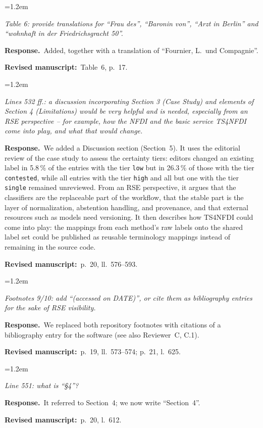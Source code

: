 \documentclass[11pt,a4paper]{article}
\newenvironment{reviewercomment}
  {\par\smallskip\begin{list}{}{\leftmargin=1.2em\rightmargin=0pt}\item[]\color{black!75}\itshape}
  {\end{list}\smallskip}
\newcommand{\response}{\par\noindent\textbf{Response.}~}
\newcommand{\where}[1]{\par\noindent\textbf{Revised manuscript:}~#1\par\medskip}
\begin{document}
\begin{enumerate}[label=\textbf{I\arabic*}, leftmargin=2.2em, itemsep=0.8em]
\item
\begin{reviewercomment}
Table 6: provide translations for ``Frau des'', ``Baronin von'', ``Arzt in Berlin'' and ``wohnhaft in
der Friedrichsgracht 50''.
\end{reviewercomment}
\response Added, together with a translation of ``Fournier, L.\ und Compagnie''.
\where{Table~6, p.~17.}

\item
\begin{reviewercomment}
Lines 532 ff.: a discussion incorporating Section 3 (Case Study) and elements of Section 4
(Limitations) would be very helpful and is needed, especially from an RSE perspective -- for example,
how the NFDI and the basic service TS4NFDI come into play, and what that would change.
\end{reviewercomment}
\response We added a Discussion section (Section~5). It uses the editorial review of the case study to
assess the certainty tiers: editors changed an existing label in 5.8\,\% of the entries with the tier
\texttt{low} but in 26.3\,\% of those with the tier \texttt{contested}, while all entries with the tier
\texttt{high} and all but one with the tier \texttt{single} remained unreviewed. From an RSE perspective, it argues that the
classifiers are the replaceable part of the workflow, that the stable part is the layer of
normalization, abstention handling, and provenance, and that external resources such as models need
versioning. It then describes how TS4NFDI could come into play: the mappings from each method's raw
labels onto the shared label set could be published as reusable terminology mappings instead of
remaining in the source code.
\where{p.~20, ll.~576--593.}

\item
\begin{reviewercomment}
Footnotes 9/10: add ``(accessed on DATE)'', or cite them as bibliography entries for the sake of RSE
visibility.
\end{reviewercomment}
\response We replaced both repository footnotes with citations of a bibliography entry for the
software (see also Reviewer~C, C.1).
\where{p.~19, ll.~573--574; p.~21, l.~625.}

\item
\begin{reviewercomment}
Line 551: what is ``\S 4''?
\end{reviewercomment}
\response It referred to Section~4; we now write ``Section~4''.
\where{p.~20, l.~612.}


\end{enumerate}
\end{document}
